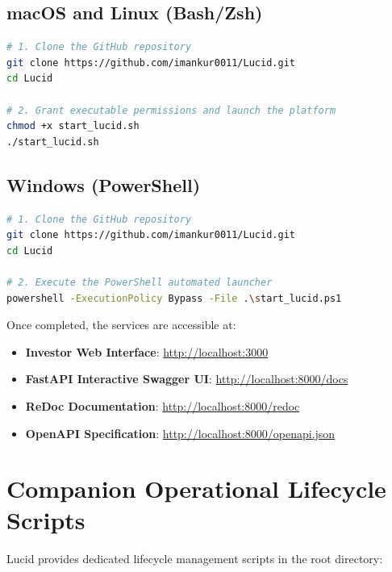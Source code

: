 \subsection{macOS and Linux (Bash/Zsh)}
\begin{lstlisting}[language=bash]
# 1. Clone the GitHub repository
git clone https://github.com/imankur0011/Lucid.git
cd Lucid

# 2. Grant executable permissions and launch the platform
chmod +x start_lucid.sh
./start_lucid.sh
\end{lstlisting}

\subsection{Windows (PowerShell)}
\begin{lstlisting}[language=bash]
# 1. Clone the GitHub repository
git clone https://github.com/imankur0011/Lucid.git
cd Lucid

# 2. Execute the PowerShell automated launcher
powershell -ExecutionPolicy Bypass -File .\start_lucid.ps1
\end{lstlisting}

Once completed, the services are accessible at:
\begin{itemize}
    \item \textbf{Investor Web Interface}: \url{http://localhost:3000}
    \item \textbf{FastAPI Interactive Swagger UI}: \url{http://localhost:8000/docs}
    \item \textbf{ReDoc Documentation}: \url{http://localhost:8000/redoc}
    \item \textbf{OpenAPI Specification}: \url{http://localhost:8000/openapi.json}
\end{itemize}

\section{Companion Operational Lifecycle Scripts}
Lucid provides dedicated lifecycle management scripts in the root directory:

